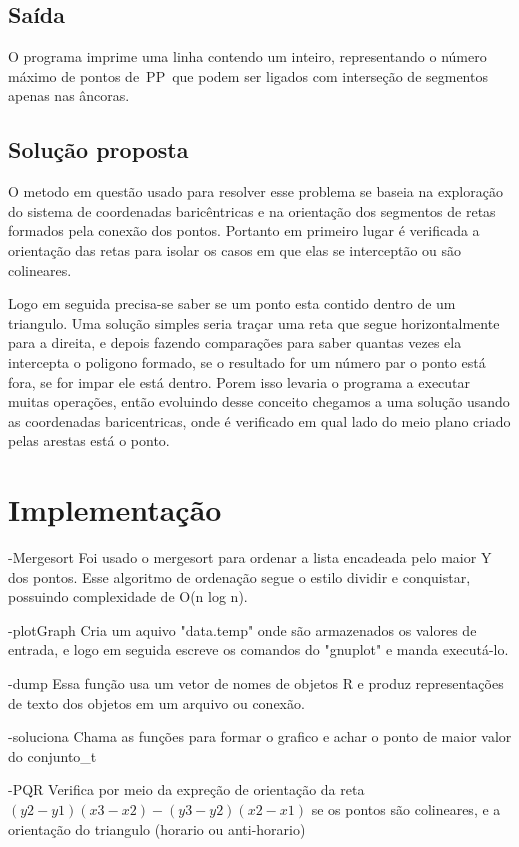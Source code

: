 \documentclass[12pt,a4paper]{article}
\begin{document}
\subsection{Saída}

O programa imprime uma linha contendo um inteiro, representando o número máximo de pontos de PP que podem ser ligados com interseção de segmentos apenas nas âncoras.

\subsection{Solução proposta}

O metodo em questão usado para resolver esse problema se baseia na exploração do sistema de coordenadas baricêntricas e na orientação dos segmentos de retas formados pela conexão dos pontos. Portanto em primeiro lugar é verificada a orientação das retas para isolar os casos em que elas se interceptão ou são colineares.

Logo em seguida precisa-se saber se um ponto esta contido dentro de um triangulo. Uma solução simples seria traçar uma reta que segue horizontalmente para a direita, e depois fazendo comparações para saber quantas vezes ela intercepta o poligono formado, se o resultado for um número par o ponto está fora, se for impar ele está dentro. Porem isso levaria o programa a executar muitas operações, então evoluindo desse conceito chegamos a uma solução usando as coordenadas baricentricas, onde é verificado em qual lado do meio plano criado pelas arestas está o ponto.


\section{Implementação}

-Mergesort
Foi usado o mergesort para ordenar a lista encadeada pelo maior Y dos pontos. Esse algoritmo de ordenação segue o estilo dividir e conquistar, possuindo complexidade de O(n log n).

-plotGraph
Cria um aquivo "data.temp" onde são armazenados os valores de entrada, e logo em seguida escreve os comandos do "gnuplot" e manda executá-lo.

-dump 
Essa função usa um vetor de nomes de objetos R e produz representações de texto dos objetos em um arquivo ou conexão.

-soluciona
Chama as funções para formar o grafico e achar o ponto de maior valor do conjunto_t

-PQR
Verifica por meio da expreção de orientação da reta 
$(y2−y1) (x3−x2) − (y3−y2) (x2−x1)$
se os pontos são colineares, e a orientação do triangulo (horario ou anti-horario)
\end{document}

